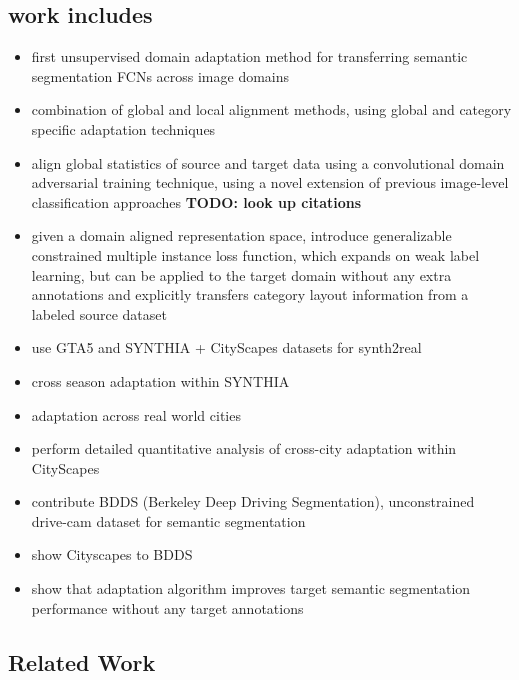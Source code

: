 \documentclass[]{article}
\newcommand{\todo}[1]{{\color{red}\bf{TODO: #1}}}
\begin{document}
\subsection{work includes}
\begin{itemize}
	\item first unsupervised domain adaptation method for transferring semantic segmentation FCNs across image domains
	\item combination of global and local alignment methods, using global and category specific adaptation techniques
	\item align global statistics of source and target data using a convolutional domain adversarial training technique, using a novel extension of previous image-level classification approaches \todo{look up citations}
	\item given a domain aligned representation space, introduce generalizable constrained multiple instance loss function, which expands on weak label learning, but can be applied to the target domain without any extra annotations and explicitly transfers category layout information from a labeled source dataset
	\item use GTA5 and SYNTHIA + CityScapes datasets for synth2real
	\item cross season adaptation within SYNTHIA
	\item adaptation across real world cities
	\item perform detailed quantitative analysis of cross-city adaptation within CityScapes
	\item contribute BDDS (Berkeley Deep Driving Segmentation), unconstrained drive-cam dataset for semantic segmentation
	\item show Cityscapes to BDDS
	\item show that adaptation algorithm improves target semantic segmentation performance without any target annotations
\end{itemize}

\subsection{Related Work}
\end{document}
